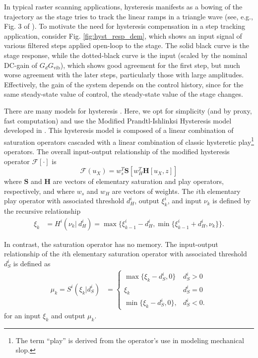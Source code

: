\documentclass[twocolumn,twoside]{IEEEtran}
\newcommand{\Gv}{\ensuremath{G_{\text{vib}}}\xspace}
\begin{document}
In typical raster scanning applications, hysteresis manifests as a bowing of the trajectory as the stage tries to track the linear ramps in a triangle wave (see, e.g., Fig. 3 of \cite{Leang_IEEECS_2009}). To motivate the need for hysteresis compensation in a step tracking application, consider Fig. \ref{fig:hyst_resp_dem}, which shows an input signal of various filtered steps applied open-loop to the stage. The solid black curve is the stage response, while the dotted-black curve is the input (scaled by the nominal DC-gain of $G_d\Gv$), which shows good agreement for the first step, but much worse agreement with the later steps, particularly those with large amplitudes. Effectively, the gain of the system depends on the control history, since for the same steady-state value of control, the steady-state value of the stage changes.

There are many models for hysteresis \cite{croft_creep_1999, rakotondrabe_bouc_2011, Lui_hysteresis_2013}. Here, we opt for simplicity (and by proxy, fast computation) and use the Modified Prandtl-Ishlinksi Hysteresis model developed in \cite{kuhnen_modeling_2003}. This hysteresis model is composed of a linear combination of saturation operators cascaded with a linear combination of classic hysteretic play\footnote{The term ``play'' is derived from the operator's use in modeling mechanical slop.} operators. The overall input-output relationship of the modified hysteresis operator $\mathcal{F}[\cdot]$ is
\begin{equation}
  \mathcal{F}(u_X) = w_s^T\mathbf{S}\left[w_H^T \mathbf{H}[u_X, z]\right]\nonumber
\end{equation}
where $\mathbf{S}$ and $\mathbf{H}$ are vectors of elementary saturation and play operators, respectively, and
where $w_s$ and $w_H$ are vectors of weights. The $i$th elementary play operator with associated threshold $d_H^i$, output $\xi_k^i$, and input $\nu_k$ is defined by the recursive relationship
\begin{align}
  \xi_k &=
  H^i(\nu_k|\: d_H^i) =
  \max\{\xi^i_{k-1}-d_H^i, \min\{\xi^i_{k-1} + d_H^i, \nu_k\} \}.\nonumber
\end{align}

In contrast, the saturation operator has no memory. The input-output relationship of the $i$th elementary saturation operator with associated threshold $d_S^i$ is defined as
\begin{align}
  \mu_k=
  S^i(\xi_k| d_S^i) &=
  \begin{cases}
    \max\{\xi_k - d_S^i, 0\} & d_S^i >0\nonumber\\
    \xi_k & d_S^i = 0\nonumber\\
    \min\{\xi_k-d_S^i, 0\},  & d_S^i<0.\nonumber
  \end{cases}
\end{align}
for an input $\xi_k$ and output $\mu_k$. 
\end{document}
